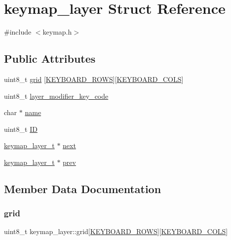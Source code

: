 \hypertarget{structkeymap__layer}{}\section{keymap\+\_\+layer Struct Reference}
\label{structkeymap__layer}


{\ttfamily \#include $<$keymap.\+h$>$}

\subsection*{Public Attributes}
\begin{DoxyCompactItemize}
\item 
uint8\+\_\+t \hyperlink{structkeymap__layer_a1c9fcbc8221bc88e27f2968b9d5b0ff4}{grid} \mbox{[}\hyperlink{keymap_8h_ab89c69b09d4ca01020b7c40d9ca2bab8}{K\+E\+Y\+B\+O\+A\+R\+D\+\_\+\+R\+O\+WS}\mbox{]}\mbox{[}\hyperlink{keymap_8h_ada65ea6a2010790e481acf033b2f8351}{K\+E\+Y\+B\+O\+A\+R\+D\+\_\+\+C\+O\+LS}\mbox{]}
\item 
uint8\+\_\+t \hyperlink{structkeymap__layer_a7047d444d87dbef1d9b94a4f693c8b99}{layer\+\_\+modifier\+\_\+key\+\_\+code}
\item 
char $\ast$ \hyperlink{structkeymap__layer_a27abe37ebc98f4593d3cd7b8a6b128f4}{name}
\item 
uint8\+\_\+t \hyperlink{structkeymap__layer_a844a293f9afcb9f783884df3b73e15ac}{ID}
\item 
\hyperlink{keymap_8h_a09117a6f418904d4009f63e96c2b9b92}{keymap\+\_\+layer\+\_\+t} $\ast$ \hyperlink{structkeymap__layer_ae83e68b4024d4c50bf85a8fbef5b31c2}{next}
\item 
\hyperlink{keymap_8h_a09117a6f418904d4009f63e96c2b9b92}{keymap\+\_\+layer\+\_\+t} $\ast$ \hyperlink{structkeymap__layer_a2781731a6504269fe862c1a075d2405b}{prev}
\end{DoxyCompactItemize}


\subsection{Member Data Documentation}
\mbox{\label{structkeymap__layer_a1c9fcbc8221bc88e27f2968b9d5b0ff4}} 
\subsubsection{\texorpdfstring{grid}{grid}}
{\footnotesize\ttfamily uint8\+\_\+t keymap\+\_\+layer\+::grid\mbox{[}\hyperlink{keymap_8h_ab89c69b09d4ca01020b7c40d9ca2bab8}{K\+E\+Y\+B\+O\+A\+R\+D\+\_\+\+R\+O\+WS}\mbox{]}\mbox{[}\hyperlink{keymap_8h_ada65ea6a2010790e481acf033b2f8351}{K\+E\+Y\+B\+O\+A\+R\+D\+\_\+\+C\+O\+LS}\mbox{]}}

